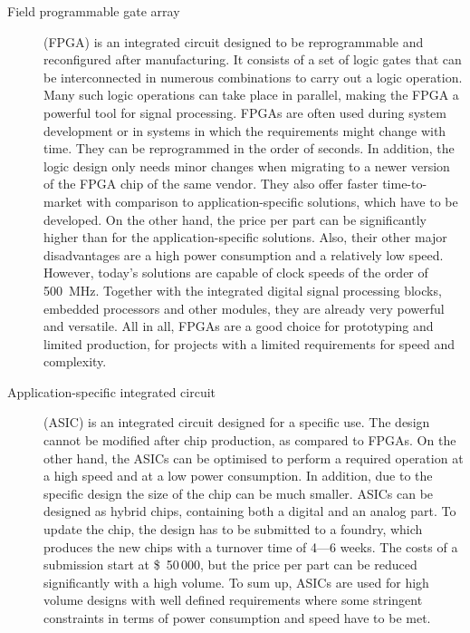\documentclass[twoside,12pt]{packages/mytustyle}  %
\begin{document}
\begin{description}
\item[Field programmable gate array] (FPGA) is an integrated circuit designed to be reprogrammable and reconfigured after manufacturing. It consists of a set of logic gates that can be interconnected in numerous combinations to carry out a logic operation. Many such logic operations can take place in parallel, making the FPGA a powerful tool for signal processing. FPGAs are often used during system development or in systems in which the requirements might change with time. They can be reprogrammed in the order of seconds. In addition, the logic design only needs minor changes when migrating to a newer version of the FPGA chip of the same vendor. They also offer faster time-to-market with comparison to application-specific solutions, which have to be developed. On the other hand, the price per part can be significantly higher than for the application-specific solutions. Also, their other major disadvantages are a high power consumption and a relatively low speed. However, today's solutions are capable of clock speeds of the order of 500~MHz. Together with the integrated digital signal processing blocks, embedded processors and other modules, they are already very powerful and versatile. All in all, FPGAs are a good choice for prototyping and limited production, for projects with a limited requirements for speed and complexity.

\item[Application-specific integrated circuit] (ASIC) is an integrated circuit designed for a specific use. The design cannot be modified after chip production, as compared to FPGAs. On the other hand, the ASICs can be optimised to perform a required operation at a high speed and at a low power consumption. In addition, due to the specific design the size of the chip can be much smaller. ASICs can be designed as hybrid chips, containing both a digital and an analog part.  
To update the chip, the design has to be submitted to a foundry, which produces the new chips with a turnover time of 4---6 weeks. The costs of a submission start at \$~50\,000, but the price per part can be reduced significantly with a high volume. To sum up, ASICs are used for high volume designs with well defined requirements where some stringent constraints in terms of power consumption and speed have to be met.
\end{description} 
\end{document}
